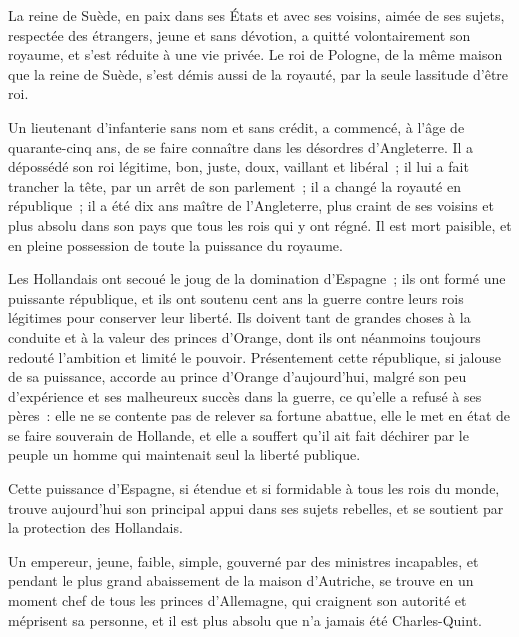\documentclass[french,twoside]{book} %
\begin{document}
La reine de Suède, en paix dans ses États et avec ses voisins, aimée de ses sujets, respectée des étrangers, jeune et sans dévotion, a quitté volontairement son royaume, et s’est réduite à une vie privée. Le roi de Pologne, de la même maison que la reine de Suède, s’est démis aussi de la royauté, par la seule lassitude d’être roi.\par
Un lieutenant d’infanterie sans nom et sans crédit, a commencé, à l’âge de quarante-cinq ans, de se faire connaître dans les désordres d’Angleterre. Il a dépossédé son roi légitime, bon, juste, doux, vaillant et libéral ; il lui a fait trancher la tête, par un arrêt de son parlement ; il a changé la royauté en république ; il a été dix ans maître de l’Angleterre, plus craint de ses voisins et plus absolu dans son pays que tous les rois qui y ont régné. Il est mort paisible, et en pleine possession de toute la puissance du royaume.\par
Les Hollandais ont secoué le joug de la domination d’Espagne ; ils ont formé une puissante république, et ils ont soutenu cent ans la guerre contre leurs rois légitimes pour conserver leur liberté. Ils doivent tant de grandes choses à la conduite et à la valeur des princes d’Orange, dont ils ont néanmoins toujours redouté l’ambition et limité le pouvoir. Présentement cette république, si jalouse de sa puissance, accorde au prince d’Orange d’aujourd’hui, malgré son peu d’expérience et ses malheureux succès dans la guerre, ce qu’elle a refusé à ses pères : elle ne se contente pas de relever sa fortune abattue, elle le met en état de se faire souverain de Hollande, et elle a souffert qu’il ait fait déchirer par le peuple un homme qui maintenait seul la liberté publique.\par
Cette puissance d’Espagne, si étendue et si formidable à tous les rois du monde, trouve aujourd’hui son principal appui dans ses sujets rebelles, et se soutient par la protection des Hollandais.\par
Un empereur, jeune, faible, simple, gouverné par des ministres incapables, et pendant le plus grand abaissement de la maison d’Autriche, se trouve en un moment chef de tous les princes d’Allemagne, qui craignent son autorité et méprisent sa personne, et il est plus absolu que n’a jamais été Charles-Quint.\par
\end{document}
